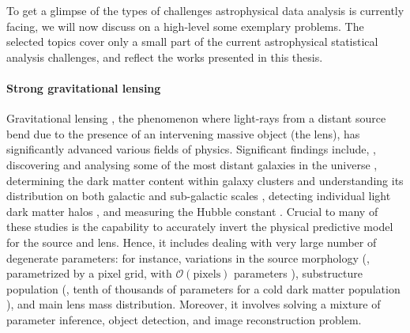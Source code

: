To get a glimpse of the types of challenges astrophysical data analysis is currently facing, we will now discuss on a high-level some exemplary problems. The selected topics cover only a small part of the current astrophysical statistical analysis challenges, and reflect the works presented in this thesis.

\vspace{-0.5cm}
\paragraph{Strong gravitational lensing}
Gravitational lensing \cite{Meneghetti:2016aa}, the phenomenon where light-rays from a distant source bend due to the presence of an intervening massive object (the lens), has significantly advanced various fields of physics. Significant findings include, \eg, discovering and analysing some of the most distant galaxies in the universe \cite[\eg][]{Zitrin_2015, Naidu_2022, Treu_2015}, determining the dark matter content within galaxy clusters and understanding its distribution on both galactic and sub-galactic scales \cite[\eg][]{Dalal:2001fq, Vegetti:2014lqa, Gilman:2019nap, Hsueh:2019ynk, Nightingale:2014aa}, detecting individual light dark matter halos \cite[\eg][]{Vegetti:2009cz, Vegetti:2012mc, Hezaveh:2016ltk}, and measuring the Hubble constant \cite[\eg][]{Suyu_2020, Birrer_2020}. Crucial to many of these studies is the capability to accurately invert the physical predictive model for the source and lens. Hence, it includes dealing with very large number of degenerate parameters: for instance, variations in the source morphology (\eg, parametrized by a pixel grid, with $\mathcal{O}(\text{pixels})$ parameters \cite[\eg][]{Karchev:2021fro}), substructure population (\eg, tenth of thousands of parameters for a cold dark matter population \cite[\eg][]{Montel:2022fhv}), and main lens mass distribution. Moreover, it involves solving a mixture of parameter inference, object detection, and image reconstruction problem.
   
\vspace{-0.4cm}     
